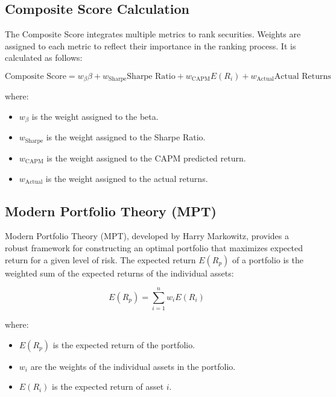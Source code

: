 \subsection{Composite Score Calculation}
The Composite Score integrates multiple metrics to rank securities. Weights are assigned to each metric to reflect their importance in the ranking process. It is calculated as follows:

\begin{equation}
\text{Composite Score} = w_{\beta} \beta + w_{\text{Sharpe}} \text{Sharpe Ratio} + w_{\text{CAPM}} E(R_i) + w_{\text{Actual}} \text{Actual Returns}
\end{equation}

where:
\begin{itemize}
    \item $w_{\beta}$ is the weight assigned to the beta.
    \item $w_{\text{Sharpe}}$ is the weight assigned to the Sharpe Ratio.
    \item $w_{\text{CAPM}}$ is the weight assigned to the CAPM predicted return.
    \item $w_{\text{Actual}}$ is the weight assigned to the actual returns.
\end{itemize}




\subsection{Modern Portfolio Theory (MPT)}
Modern Portfolio Theory (MPT), developed by Harry Markowitz, \citep{markowitz1952portfolio} provides a robust framework for constructing an optimal portfolio that maximizes expected return for a given level of risk. The expected return $E(R_p)$ of a portfolio is the weighted sum of the expected returns of the individual assets:

\begin{equation}
E(R_p) = \sum_{i=1}^n w_iE(R_i)
\end{equation}

where:
\begin{itemize}
    \item $E(R_p)$ is the expected return of the portfolio.
    \item $w_i$ are the weights of the individual assets in the portfolio.
    \item $E(R_i)$ is the expected return of asset $i$.
\end{itemize}

